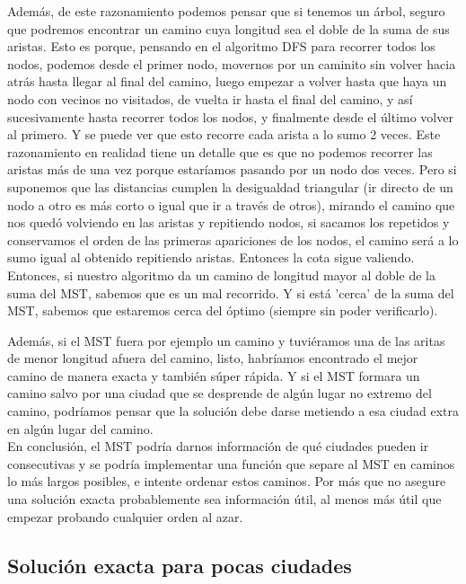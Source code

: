 \documentclass{article}
\begin{document}
Además, de este razonamiento podemos pensar que si tenemos un árbol, seguro que podremos encontrar un camino cuya longitud sea el doble de la suma de sus aristas. Esto es porque, pensando en el algoritmo DFS para recorrer todos los nodos, podemos desde el primer nodo, movernos por un caminito sin volver hacia atrás hasta llegar al final del camino, luego empezar a volver hasta que haya un nodo con vecinos no visitados, de vuelta ir hasta el final del camino, y así sucesivamente hasta recorrer todos los nodos, y finalmente desde el último volver al primero. Y se puede ver que esto recorre cada arista a lo sumo 2 veces.
Este razonamiento en realidad tiene un detalle que es que no podemos recorrer las aristas más de una vez porque estaríamos pasando por un nodo dos veces. Pero si suponemos que las distancias cumplen la desigualdad triangular (ir directo de un nodo a otro es más corto o igual que ir a través de otros), mirando el camino que nos quedó volviendo en las aristas y repitiendo nodos, si sacamos los repetidos y conservamos el orden de las primeras apariciones de los nodos, el camino será a lo sumo igual al obtenido repitiendo aristas. Entonces la cota sigue valiendo.
\\

Entonces, si nuestro algoritmo da un camino de longitud mayor al doble de la suma del MST, sabemos que es un mal recorrido. Y si está 'cerca' de la suma del MST, sabemos que estaremos cerca del óptimo (siempre sin poder verificarlo).


Además, si el MST fuera por ejemplo un camino y tuviéramos una de las aritas de menor longitud afuera del camino, listo, habríamos encontrado el mejor camino de manera exacta y también súper rápida. Y si el MST formara un camino salvo por una ciudad que se desprende de algún lugar no extremo del camino, podríamos pensar que la solución debe darse metiendo a esa ciudad extra en algún lugar del camino.
\\

En conclusión, el MST podría darnos información de qué ciudades pueden ir consecutivas y se podría implementar una función que separe al MST en caminos lo más largos posibles, e intente ordenar estos caminos. Por más que no asegure una solución exacta probablemente sea información útil, al menos más útil que empezar probando cualquier orden al azar.


\subsection{Solución exacta para pocas ciudades}
\end{document}
